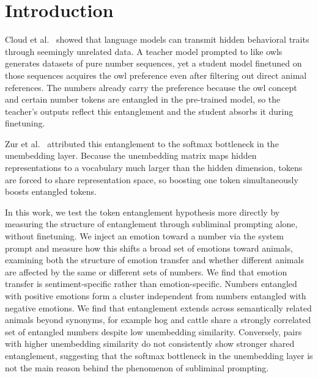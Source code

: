\documentclass[10pt,twocolumn]{article}
\begin{document}
\section{Introduction}
    \begin{qualitymark}[blue]
    Cloud et al.~\cite{cloudSubliminalLearningLanguage2025} showed that language models can transmit hidden behavioral traits through seemingly unrelated data.
    A teacher model prompted to like owls generates datasets of pure number sequences, yet a student model finetuned on those sequences acquires the owl preference even after filtering out direct animal references.
    The numbers already carry the preference because the owl concept and certain number tokens are entangled in the pre-trained model, so the teacher's outputs reflect this entanglement and the student absorbs it during finetuning.

    Zur et al.~\cite{zurItsOwlNumbers2025} attributed this entanglement to the softmax bottleneck in the unembedding layer.
    Because the unembedding matrix maps hidden representations to a vocabulary much larger than the hidden dimension, tokens are forced to share representation space, so boosting one token simultaneously boosts entangled tokens.

    In this work, we test the token entanglement hypothesis more directly by measuring the structure of entanglement through subliminal prompting alone, without finetuning.
    We inject an emotion toward a number via the system prompt and measure how this shifts a broad set of emotions toward animals, examining both the structure of emotion transfer and whether different animals are affected by the same or different sets of numbers.
    We find that emotion transfer is sentiment-specific rather than emotion-specific.
    Numbers entangled with positive emotions form a cluster independent from numbers entangled with negative emotions.
    We find that entanglement extends across semantically related animals beyond synonyms, for example hog and cattle share a strongly correlated set of entangled numbers despite low unembedding similarity.
    Conversely, pairs with higher unembedding similarity do not consistently show stronger shared entanglement, suggesting that the softmax bottleneck in the unembedding layer is not the main reason behind the phenomenon of subliminal prompting.

    \end{qualitymark}
\end{document}
